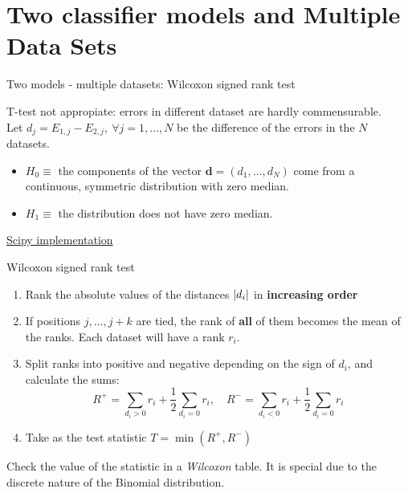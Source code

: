 \documentclass{beamer}
\DeclarePairedDelimiter\abs{\lvert}{\rvert}%
\begin{document}

\section{Two classifier models and Multiple Data Sets}


\begin{frame}{Two models - multiple datasets: Wilcoxon signed rank test}

T-test not appropiate: errors in different dataset are hardly commensurable.\\

Let \(d_j =E_{1,j} - E_{2,j}, \ \forall j = 1,\dots,N \) be the difference of the errors in the \(N\) datasets.\\
\begin{itemize}
    \item \(H_0 \equiv\) the components of the vector \(\mathbf{d} = (d_1,\dots,d_N)\) come from a continuous, symmetric distribution with zero median. 
\item \(H_1 \equiv\) the distribution does not have zero median.
\end{itemize}

\vspace{1cm}
\href{https://docs.scipy.org/doc/scipy/reference/generated/scipy.stats.wilcoxon.html}{Scipy implementation}
\end{frame}


\begin{frame}{Wilcoxon signed rank test}
    \begin{enumerate}
        \item Rank the absolute values of the distances \(\abs{d_i}\) in \textbf{increasing order}
        \item If positions \(j,\dots,j+k\) are tied, the rank of \textbf{all} of them becomes the mean of the ranks. Each dataset will have a rank \(r_i\).
        \item Split ranks into positive and negative depending on the sign of \(d_i\), and calculate the sums:
        \[
R^+ = \sum_{d_i > 0} r_i + \frac{1}{2} \sum_{d_i=0}r_i, \quad R^- = \sum_{d_i < 0} r_i + \frac{1}{2} \sum_{d_i=0}r_i
        \]
        \item Take as the test statistic \(T = \min(R^+,R^-)\)
    \end{enumerate}

        \pause

        Check the value of the statistic in a \emph{Wilcoxon} table. It is special due to the discrete nature of the Binomial distribution.
\end{frame}
\end{document}
